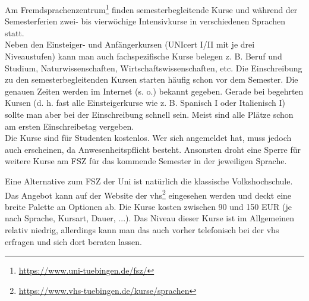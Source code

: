 Am Fremdsprachenzentrum\footnote{\url{https://www.uni-tuebingen.de/fsz/}} finden semesterbegleitende Kurse und während der Semesterferien zwei- bis vierwöchige Intensivkurse in verschiedenen Sprachen statt.\\
Neben den Einsteiger- und Anfängerkursen (UNIcert I/II mit je drei Niveaustufen) kann man auch fachspezifische Kurse belegen z. B. Beruf und Studium, Naturwissenschaften, Wirtschaftswissenschaften, etc.  
Die Einschreibung zu den semesterbegleitenden Kursen starten häufig schon vor dem Semester. Die genauen Zeiten werden im Internet (s. o.) bekannt gegeben.  Gerade bei begehrten Kursen (d. h. fast alle Einsteigerkurse wie z. B. Spanisch I oder Italienisch I) sollte man aber bei der  Einschreibung schnell sein. Meist sind alle Plätze schon am ersten Einschreibetag vergeben.\\
Die Kurse sind für Studenten kostenlos. Wer sich angemeldet hat, muss jedoch auch erscheinen, da Anwesenheitspflicht besteht. Ansonsten droht eine Sperre für weitere Kurse am FSZ für das kommende Semester in der jeweiligen Sprache.
  
Eine Alternative zum FSZ der Uni ist natürlich die klassische Volkshochschule. Das Angebot kann auf der Website der vhs\footnote{\url{https://www.vhs-tuebingen.de/kurse/sprachen}} eingesehen werden und deckt eine breite Palette an Optionen ab. 
Die Kurse kosten zwischen 90 und 150 EUR (je nach Sprache, Kursart, Dauer, ...). Das Niveau dieser Kurse ist im Allgemeinen relativ niedrig, allerdings kann man das auch vorher telefonisch bei der vhs erfragen und sich dort beraten lassen.

\vfill
